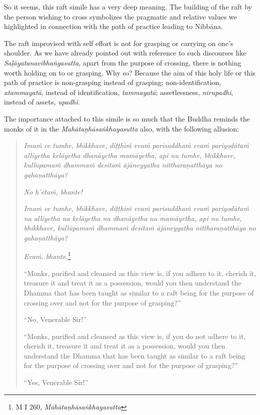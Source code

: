 So it seems, this raft simile has a very deep meaning. The building of the raft by the person wishing to cross symbolizes the pragmatic and relative values we highlighted in connection with the path of practice leading to Nibbāna.

The raft improvised with self effort is not for grasping or carrying on one's shoulder. As we have already pointed out with reference to such discourses like \emph{Saḷāyatanavibhaṅgasutta}, apart from the purpose of crossing, there is nothing worth holding on to or grasping. Why so? Because the aim of this holy life or this path of practice is non-grasping instead of grasping; non-identification, \emph{atammayatā}, instead of identification, \emph{tammayatā}; assetlessness, \emph{nirupadhi}, instead of assets, \emph{upadhi}.

The importance attached to this simile is so much that the Buddha reminds the monks of it in the \emph{Mahātaṇhāsaṅkhayasutta} also, with the following allusion:

\begin{quote}
\emph{Imaṁ ce tumhe, bhikkhave, diṭṭhiṁ evaṁ parisuddhaṁ evaṁ pariyodātaṁ allīyetha kelāyetha dhanāyetha mamāyetha, api nu tumhe, bhikkhave, kullūpamaṁ dhammaṁ desitaṁ ājāneyyatha nittharaṇatthāya no gahaṇatthāya?}

\emph{No h'etaṁ, bhante!}

\emph{Imaṁ ce tumhe, bhikkhave, diṭṭhiṁ evaṁ parisuddhaṁ evaṁ pariyodātaṁ na allīyetha na kelāyetha na dhanāyetha na mamāyetha, api nu tumhe, bhikkhave, kullūpamaṁ dhammaṁ desitaṁ ājāneyyatha nittharaṇatthāya no gahaṇatthāya?}

\emph{Evaṁ, bhante.}\footnote{M I 260, \emph{Mahātaṇhāsaṅkhayasutta}}

``Monks, purified and cleansed as this view is, if you adhere to it, cherish it, treasure it and treat it as a possession, would you then understand the Dhamma that has been taught as similar to a raft being for the purpose of crossing over and not for the purpose of grasping?''

``No, Venerable Sir!''

``Monks, purified and cleansed as this view is, if you do not adhere to it, cherish it, treasure it and treat it as a possession, would you then understand the Dhamma that has been taught as similar to a raft being for the purpose of crossing over and not for the purpose of grasping?''

``Yes, Venerable Sir!''
\end{quote}

